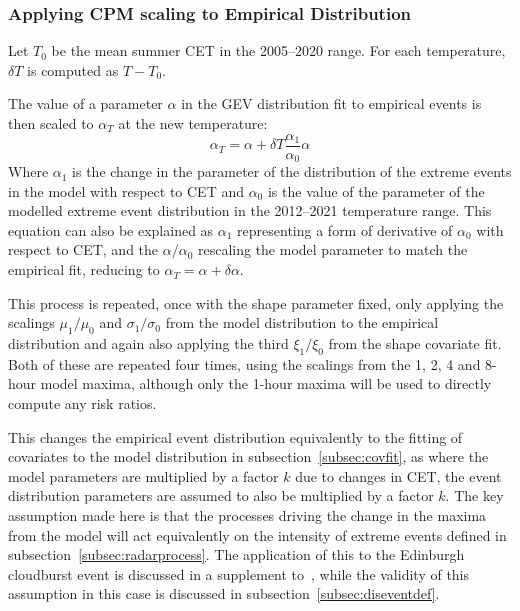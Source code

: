 \subsubsection{Applying CPM scaling to Empirical Distribution}

Let $T_0$ be the mean summer CET in the 2005--2020 range.
For each temperature, $\delta T$ is computed as $T - T_0$.

The value of a parameter $\alpha$ in the GEV distribution fit to empirical events is then scaled to $\alpha_T$ at the new temperature:
\begin{equation}\label{eq:newradarparams}
    \alpha_T = \alpha + \delta T \frac{\alpha_1}{\alpha_0} \alpha
\end{equation}
Where $\alpha_1$ is the change in the parameter of the distribution of the extreme events in the model with respect to CET and
    $\alpha_0$ is the value of the parameter of the modelled extreme event distribution in the 2012--2021 temperature range.
This equation can also be explained as $\alpha_1$ representing a form of derivative of $\alpha_0$ with respect to CET,
    and the $\alpha / \alpha_0$ rescaling the model parameter to match the empirical fit, reducing to
    $\alpha_T = \alpha + \delta \alpha$.

This process is repeated, once with the shape parameter fixed, only applying the scalings $\mu_1 / \mu_0$ and $\sigma_1 / \sigma_0$
    from the model distribution to the empirical distribution and again also applying the third $\xi_1 / \xi_0$ from the shape covariate fit.
Both of these are repeated four times, using the scalings from the 1, 2, 4 and 8-hour model maxima,
    although only the 1-hour maxima will be used to directly compute any risk ratios.

This changes the empirical event distribution equivalently to the fitting of covariates to the model distribution in subsection~\ref{subsec:covfit},
    as where the model parameters are multiplied by a factor $k$ due to changes in CET,
    the event distribution parameters are assumed to also be multiplied by a factor $k$.
The key assumption made here is that the processes driving the change in the maxima from the model will act equivalently
    on the intensity of extreme events defined in subsection~\ref{subsec:radarprocess}.
The application of this to the Edinburgh cloudburst event is discussed in a supplement to~\cite{Tett_Soon},
    while the validity of this assumption in this case is discussed in subsection~\ref{subsec:diseventdef}.

